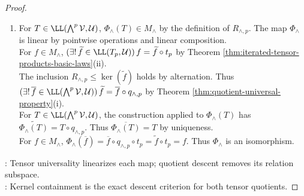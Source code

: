 \begin{theorem}
\begin{proof}
\begin{enumerate}[label=(\roman*)]
For $T\in\LL(\operatorname{Sym}^{p}(\mathcal{V}),\mathcal{U})$, the construction applied to $\Phi_{\vee}(T)$ has $\widetilde{\Phi_{\vee}(T)}=T\circ q_{\vee,p}$. Thus $\overline{\Phi_{\vee}(T)}=T$ by uniqueness.\\
For $f\in M_{\vee}$, $\Phi_{\vee}(\overline{f})=\overline{f}\circ q_{\vee,p}\circ t_p=\widetilde{f}\circ t_p=f$. Thus $\Phi_{\vee}$ is an isomorphism.
\item For $T\in\LL(\bigwedge^{p}\mathcal{V},\mathcal{U})$, $\Phi_{\wedge}(T)\in M_{\wedge}$ by the definition of $R_{\wedge,p}$. The map $\Phi_{\wedge}$ is linear by pointwise operations and linear composition.\\
For $f\in M_{\wedge}$, $(\exists!\,\widetilde{f}\in\LL(T_p,\mathcal{U}))\,f=\widetilde{f}\circ t_p$ by Theorem \ref{thm:iterated-tensor-products-basic-laws}(ii).\\
The inclusion $R_{\wedge,p}\leq\ker(\widetilde{f})$ holds by alternation. Thus $(\exists!\,\overline{f}\in\LL(\bigwedge^{p}\mathcal{V},\mathcal{U}))\,\widetilde{f}=\overline{f}\circ q_{\wedge,p}$ by Theorem \ref{thm:quotient-universal-property}(i).\\
For $T\in\LL(\bigwedge^{p}\mathcal{V},\mathcal{U})$, the construction applied to $\Phi_{\wedge}(T)$ has $\widetilde{\Phi_{\wedge}(T)}=T\circ q_{\wedge,p}$. Thus $\overline{\Phi_{\wedge}(T)}=T$ by uniqueness.\\
For $f\in M_{\wedge}$, $\Phi_{\wedge}(\overline{f})=\overline{f}\circ q_{\wedge,p}\circ t_p=\widetilde{f}\circ t_p=f$. Thus $\Phi_{\wedge}$ is an isomorphism.
\end{enumerate}
: Tensor universality linearizes each map; quotient descent removes its relation subspace.\\
: Kernel containment is the exact descent criterion for both tensor quotients.
\end{proof}
\end{theorem}

